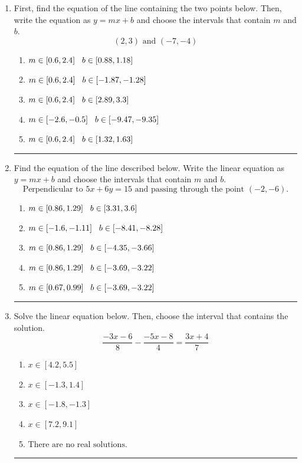 \documentclass[14pt]{extbook}
\newcommand{\litem}[1]{\item#1\hspace*{-1cm}\rule{\textwidth}{0.4pt}}
\begin{document}
\begin{enumerate}
{\begin{enumerate}[label=\Alph*.]
\end{enumerate} }
\litem{
First, find the equation of the line containing the two points below. Then, write the equation as $ y=mx+b $ and choose the intervals that contain $m$ and $b$.\[ (2, 3) \text{ and } (-7, -4) \]\begin{enumerate}[label=\Alph*.]
\item \( m \in [0.6, 2.4] \hspace*{3mm} b \in [0.88, 1.18] \)
\item \( m \in [0.6, 2.4] \hspace*{3mm} b \in [-1.87, -1.28] \)
\item \( m \in [0.6, 2.4] \hspace*{3mm} b \in [2.89, 3.3] \)
\item \( m \in [-2.6, -0.5] \hspace*{3mm} b \in [-9.47, -9.35] \)
\item \( m \in [0.6, 2.4] \hspace*{3mm} b \in [1.32, 1.63] \)

\end{enumerate} }
\litem{
Find the equation of the line described below. Write the linear equation as $ y=mx+b $ and choose the intervals that contain $m$ and $b$.\[ \text{Perpendicular to } 5 x + 6 y = 15 \text{ and passing through the point } (-2, -6). \]\begin{enumerate}[label=\Alph*.]
\item \( m \in [0.86, 1.29] \hspace*{3mm} b \in [3.31, 3.6] \)
\item \( m \in [-1.6, -1.11] \hspace*{3mm} b \in [-8.41, -8.28] \)
\item \( m \in [0.86, 1.29] \hspace*{3mm} b \in [-4.35, -3.66] \)
\item \( m \in [0.86, 1.29] \hspace*{3mm} b \in [-3.69, -3.22] \)
\item \( m \in [0.67, 0.99] \hspace*{3mm} b \in [-3.69, -3.22] \)

\end{enumerate} }
\litem{
Solve the linear equation below. Then, choose the interval that contains the solution.\[ \frac{-3x -6}{8} - \frac{-5x -8}{4} = \frac{3x + 4}{7} \]\begin{enumerate}[label=\Alph*.]
\item \( x \in [4.2, 5.5] \)
\item \( x \in [-1.3, 1.4] \)
\item \( x \in [-1.8, -1.3] \)
\item \( x \in [7.2, 9.1] \)
\item \( \text{There are no real solutions.} \)


\end{enumerate}}
\end{enumerate}
\end{document}
